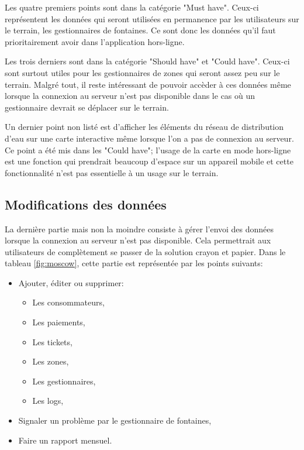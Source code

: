 \documentclass{EPL-master-thesis-covers-FR}
\begin{document}
				Les quatre premiers points sont dans la catégorie "Must have". Ceux-ci représentent les données qui seront utilisées en permanence par les utilisateurs sur le terrain, les gestionnaires de fontaines. Ce sont donc les données qu'il faut prioritairement avoir dans l'application hors-ligne.
				
				Les trois derniers sont dans la catégorie "Should have" et "Could have". Ceux-ci sont surtout utiles pour les gestionnaires de zones qui seront assez peu sur le terrain. Malgré tout, il reste intéressant de pouvoir accèder à ces données même lorsque la connexion au serveur n'est pas disponible dans le cas où un gestionnaire devrait se déplacer sur le terrain.
				
				Un dernier point non listé est d'afficher les éléments du réseau de distribution d'eau sur une carte interactive même lorsque l'on a pas de connexion au serveur. Ce point a été mis dans les "Could have"; l'usage de la carte en mode hors-ligne est une fonction qui prendrait beaucoup d'espace sur un appareil mobile et cette fonctionnalité n'est pas essentielle à un usage sur le terrain.

			\subsection*{Modifications des données}
				\label{sec:gest_donnee}
				La dernière partie mais non la moindre consiste à gérer l'envoi des données lorsque la connexion au serveur n'est pas disponible. Cela permettrait aux utilisateurs de complètement se passer de la solution crayon et papier.
				Dans le tableau \ref{fig:moscow}, cette partie est représentée par les points suivants:
				\begin{itemize}[noitemsep]
					\item Ajouter, éditer ou supprimer:
					\begin{itemize}[noitemsep]
						\item Les consommateurs,
						\item Les paiements,
						\item Les tickets,
						\item Les zones,
						\item Les gestionnaires,
						\item Les logs,
					\end{itemize}
					\item Signaler un problème par le gestionnaire de fontaines,
					\item Faire un rapport mensuel.
				\end{itemize}
				
\end{document}
